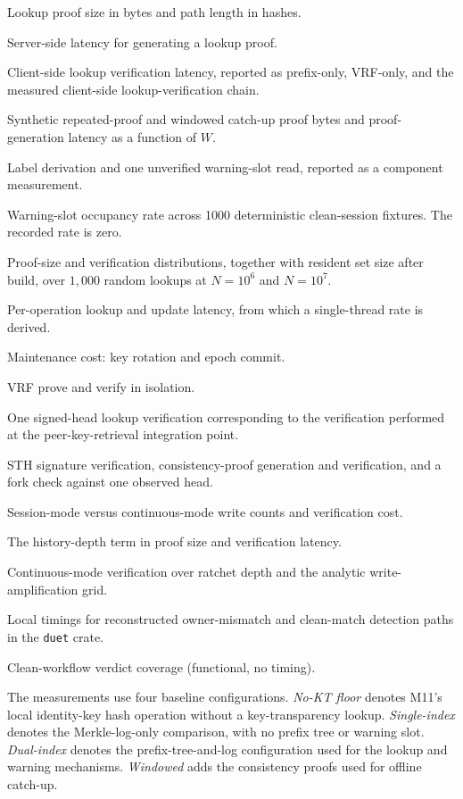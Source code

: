 \begin{description}\itemsep2pt
\item[M1] Lookup proof size in bytes and path length in hashes.
\item[M2] Server-side latency for generating a lookup proof.
\item[M3] Client-side lookup verification latency, reported as prefix-only, VRF-only,
  and the measured client-side lookup-verification chain.
\item[M4] Synthetic repeated-proof and windowed catch-up proof bytes and
  proof-generation latency as a function of $W$.
\item[M5] Label derivation and one unverified warning-slot read, reported as a component
  measurement.
\item[M6] Warning-slot occupancy rate across \num{1000} deterministic clean-session fixtures.
  The recorded rate is zero.
\item[M7] Proof-size and verification distributions, together with resident set size
  after build, over $1{,}000$ random lookups at $N=10^{6}$ and $N=10^{7}$.
\item[M8] Per-operation lookup and update latency, from which a single-thread rate is derived.
\item[M9] Maintenance cost: key rotation and epoch commit.
\item[M10] VRF prove and verify in isolation.
\item[M11] One signed-head lookup verification corresponding to the verification performed
  at the peer-key-retrieval integration point.
\item[M12] STH signature verification, consistency-proof generation and verification, and
  a fork check against one observed head.
\item[M13] Session-mode versus continuous-mode write counts and verification cost.
\item[M14] The history-depth term in proof size and verification latency.
\item[M15] Continuous-mode verification over ratchet depth and the analytic
  write-amplification grid.
\item[M16] Local timings for reconstructed owner-mismatch and clean-match detection paths in the
  \texttt{duet} crate.
\item[M17] Clean-workflow verdict coverage (functional, no timing).
\end{description}

\medskip\noindent
The measurements use four baseline configurations. \emph{No-KT floor} denotes
M11's local identity-key hash operation without a key-transparency lookup.
\emph{Single-index} denotes the Merkle-log-only comparison, with no prefix
tree or warning slot. \emph{Dual-index} denotes the prefix-tree-and-log
configuration used for the lookup and warning mechanisms.
\emph{Windowed} adds the consistency proofs used for offline catch-up.

